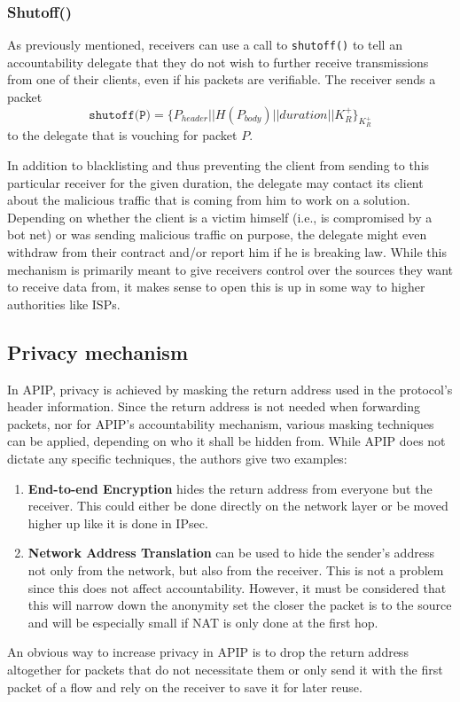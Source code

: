 \documentclass{acm_proc_article-sp}
\begin{document}
\subsubsection{Shutoff()}
As previously mentioned, receivers can use a call to \texttt{shutoff()} to tell an accountability delegate that they do not wish to further receive transmissions from one of their clients, even if his packets are verifiable. The receiver sends a packet
\begin{equation}
\texttt{shutoff(P)} = \{P_{header} || H(P_{body}) || duration || K^+_R\}_{K^+_R}
\end{equation}
to the delegate that is vouching for packet $P$.

In addition to blacklisting and thus preventing the client from sending to this particular receiver for the given duration, the delegate may contact its client about the malicious traffic that is coming from him to work on a solution. Depending on whether the client is a victim himself (i.e., is compromised by a bot net) or was sending malicious traffic on purpose, the delegate might even withdraw from their contract and/or report him if he is breaking law. While this mechanism is primarily meant to give receivers control over the sources they want to receive data from, it makes sense to open this is up in some way to higher authorities like ISPs.

\subsection{Privacy mechanism}
In APIP, privacy is achieved by masking the return address used in the protocol's header information. Since the return address is not needed when forwarding packets, nor for APIP's accountability mechanism, various masking techniques can be applied, depending on who it shall be hidden from. While APIP does not dictate any specific techniques, the authors give two examples:
\begin{enumerate}
\item \textbf{End-to-end Encryption} hides the return address from everyone but the receiver. This could either be done directly on the network layer or be moved higher up like it is done in IPsec. 
\item \textbf{Network Address Translation} can be used to hide the sender's address not only from the network, but also from the receiver. This is not a problem since this does not affect accountability. However, it must be considered that this will narrow down the anonymity set the closer the packet is to the source and will be especially small if NAT is only done at the first hop.
\end{enumerate}
An obvious way to increase privacy in APIP is to drop the return address altogether for packets that do not necessitate them or only send it with the first packet of a flow and rely on the receiver to save it for later reuse.
\end{document}

